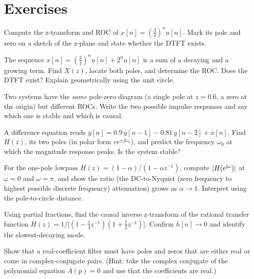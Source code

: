 \section{Exercises}
\label{ch15:exercises}

\begin{exercise}
Compute the z-transform and ROC of $x[n] = \left(\tfrac34\right)^n u[n]$. Mark its pole
and zero on a sketch of the z-plane and state whether the DTFT exists.
\end{exercise}

\begin{exercise}
The sequence $x[n] = \left(\tfrac34\right)^{n}u[n] + 2^{n}u[n]$ is a sum of a decaying and
a growing term. Find $X(z)$, locate both poles, and determine the ROC. Does the DTFT
exist? Explain geometrically using the unit circle.
\end{exercise}

\begin{exercise}
Two systems have the \emph{same} pole-zero diagram (a single pole at $z=0.6$, a zero at
the origin) but different ROCs. Write the two possible impulse responses and say which one
is stable and which is causal.
\end{exercise}

\begin{exercise}
A difference equation reads $y[n] = 0.9\,y[n-1] - 0.81\,y[n-2] + x[n]$. Find $H(z)$, its
two poles (in polar form $re^{\pm\jj\omega_0}$), and predict the frequency $\omega_0$ at
which the magnitude response peaks. Is the system stable?
\end{exercise}

\begin{exercise}
For the one-pole lowpass $H(z)=(1-\alpha)/(1-\alpha z^{-1})$, compute
$\lvert H(e^{\mathrm{j}\omega})\rvert$ at $\omega=0$ and $\omega=\pi$, and show the ratio (the
DC-to-Nyquist (zero frequency to highest possible discrete frequency) attenuation) grows as $\alpha\to 1$. Interpret using the pole-to-circle
distance.
\end{exercise}

\begin{exercise}
Using partial fractions, find the causal inverse z-transform of the rational transfer function
$H(z)=1/\bigl[(1-\tfrac14 z^{-1})\allowbreak(1+\tfrac12 z^{-1})\bigr]$. Confirm $h[n]\to 0$ and identify
the slowest-decaying mode.
\end{exercise}

\begin{exercise}
Show that a real-coefficient filter must have poles and zeros that are either real or come
in complex-conjugate pairs. (Hint: take the complex conjugate of the polynomial equation
$A(p)=0$ and use that the coefficients are real.)
\end{exercise}

